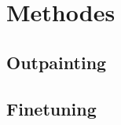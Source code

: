 \section{Methodes}
\label{sec:methodes}

\subsection{Outpainting}
\label{sec:outpainting}

\subsection{Finetuning}
\label{sec:finetuning}
